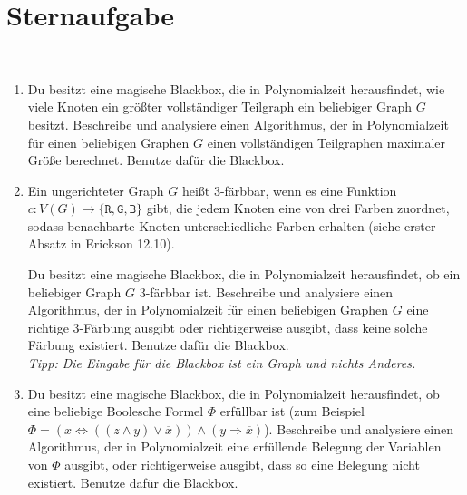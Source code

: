 \documentclass{uebung_cs}
\begin{document}


\section*{Sternaufgabe}

\begin{aufgabe}\
	\begin{enumerate}
		\item Du besitzt eine magische Blackbox, die in Polynomialzeit herausfindet, wie viele Knoten ein größter vollständiger Teilgraph ein beliebiger Graph $G$ besitzt. Beschreibe und analysiere einen Algorithmus, der in Polynomialzeit für einen beliebigen Graphen $G$ einen vollständigen Teilgraphen maximaler Größe berechnet. Benutze dafür die Blackbox.
		
		\item Ein ungerichteter Graph $G$ heißt $3$-färbbar, wenn es eine Funktion $c:V(G)\to\{\texttt{R},\texttt{G},\texttt{B}\}$ gibt, die jedem Knoten eine von drei Farben zuordnet, sodass benachbarte Knoten unterschiedliche Farben erhalten (siehe erster Absatz in Erickson 12.10).
	
		Du besitzt eine magische Blackbox, die in Polynomialzeit herausfindet, ob ein beliebiger Graph $G$ $3$-färbbar ist. Beschreibe und analysiere einen Algorithmus, der in Polynomialzeit für einen beliebigen Graphen $G$ eine richtige $3$-Färbung ausgibt oder richtigerweise ausgibt, dass keine solche Färbung existiert. Benutze dafür die Blackbox.\\
		\textit{Tipp: Die Eingabe für die Blackbox ist ein Graph und nichts Anderes.}
		
		\item Du besitzt eine magische Blackbox, die in Polynomialzeit herausfindet, ob eine beliebige Boolesche Formel $\Phi$ erfüllbar ist (zum Beispiel $\Phi= (x \Leftrightarrow ((z\wedge y)\vee \overline{x})) \wedge (y \Rightarrow \overline{x})$). Beschreibe und analysiere einen Algorithmus, der in Polynomialzeit eine erfüllende Belegung der Variablen von $\Phi$ ausgibt, oder richtigerweise ausgibt, dass so eine Belegung nicht existiert. Benutze dafür die Blackbox.
	\end{enumerate}
\end{aufgabe}
\end{document}
